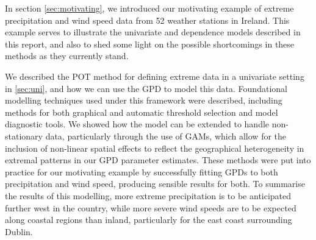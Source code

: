 \documentclass{article}
\numberwithin{equation}{section}
\begin{document}
In section \ref{sec:motivating}, we introduced our motivating example of extreme precipitation and wind speed data from 52 weather stations in Ireland. 
This example serves to illustrate the univariate and dependence models described in this report, and also to shed some light on the possible shortcomings in these methods as they currently stand.

We described the POT method for defining extreme data in a univariate setting in \ref{sec:uni}, and how we can use the GPD to model this data. 
Foundational modelling techniques used under this framework were described, including methods for both graphical and automatic threshold selection and model diagnostic tools. 
We showed how the model can be extended to handle non-stationary data, particularly through the use of GAMs, which allow for the inclusion of non-linear spatial effects to reflect the  geographical heterogeneity in extremal patterns in our GPD parameter estimates. 
These methods were put into practice for our motivating example by successfully fitting GPDs to both precipitation and wind speed, producing sensible results for both. 
To summarise the results of this modelling, more extreme precipitation is to be anticipated further west in the country, while more severe wind speeds are to be expected along coastal regions than inland, particularly for the east coast surrounding Dublin. 
\end{document}
